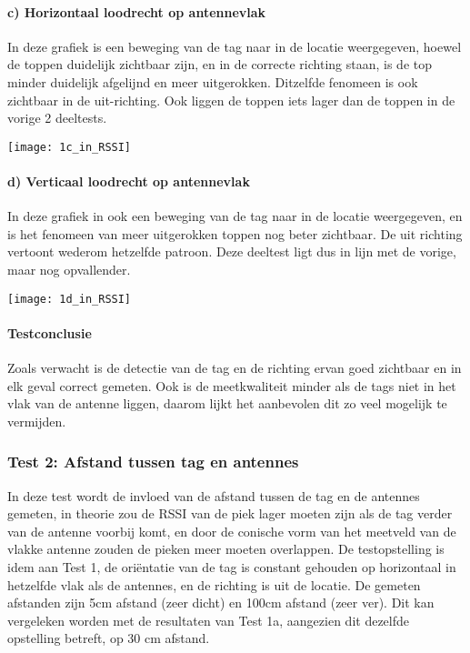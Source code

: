 \paragraph{c) Horizontaal loodrecht op antennevlak}
\begin{minipage}{0.55\textwidth}
In deze grafiek is een beweging van de tag naar in de locatie weergegeven, hoewel de toppen duidelijk zichtbaar zijn, en in de correcte richting staan, is de top minder duidelijk afgelijnd en meer uitgerokken. Ditzelfde fenomeen is ook zichtbaar in de uit-richting. Ook liggen de toppen iets lager dan de toppen in de vorige 2 deeltests.
\end{minipage}
\hfill
\begin{minipage}{0.42\textwidth}
	\texttt{[image: 1c\_in\_RSSI]}
\end{minipage}

\paragraph{d) Verticaal loodrecht op antennevlak}
\begin{minipage}{0.55\textwidth}
In deze grafiek in ook een beweging van de tag naar in de locatie weergegeven, en is het fenomeen van meer uitgerokken toppen nog beter zichtbaar. De uit richting vertoont wederom hetzelfde patroon. Deze deeltest ligt dus in lijn met de vorige, maar nog opvallender.
\end{minipage}
\hfill
\begin{minipage}{0.42\textwidth}
	\texttt{[image: 1d\_in\_RSSI]}
\end{minipage}

\paragraph{Testconclusie}
Zoals verwacht is de detectie van de tag en de richting ervan goed zichtbaar en in elk geval correct gemeten. Ook is de meetkwaliteit minder als de tags niet in het vlak van de antenne liggen, daarom lijkt het aanbevolen dit zo veel mogelijk te vermijden.

\subsubsection{Test 2: Afstand tussen tag en antennes}
In deze test wordt de invloed van de afstand tussen de tag en de antennes gemeten, in theorie zou de RSSI van de piek lager moeten zijn als de tag verder van de antenne voorbij komt, en door de conische vorm van het meetveld van de vlakke antenne zouden de pieken meer moeten overlappen. De testopstelling is idem aan Test 1, de oriëntatie van de tag is constant gehouden op horizontaal in hetzelfde vlak als de antennes, en de richting is uit de locatie. De gemeten afstanden zijn 5cm afstand (zeer dicht) en 100cm afstand (zeer ver). Dit kan vergeleken worden met de resultaten van Test 1a, aangezien dit dezelfde opstelling betreft, op 30 cm afstand.

